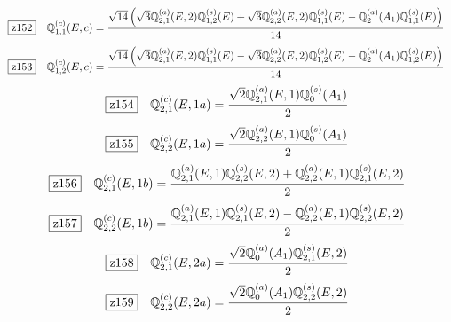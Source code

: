 \documentclass[fleqn,10pt,landscape]{jsarticle}
\begin{document}
\begin{dmath*}
\hspace*{3mm}\fbox{z152}\quad \mathbb{Q}_{1,1}^{(c)}(E,c)=\frac{\sqrt{14} \left(\sqrt{3} \mathbb{Q}_{2,1}^{(a)}(E,2) \mathbb{Q}_{1,2}^{(s)}(E) + \sqrt{3} \mathbb{Q}_{2,2}^{(a)}(E,2) \mathbb{Q}_{1,1}^{(s)}(E) - \mathbb{Q}_{2}^{(a)}(A_{1}) \mathbb{Q}_{1,1}^{(s)}(E)\right)}{14}
\end{dmath*}
\begin{dmath*}
\hspace*{3mm}\fbox{z153}\quad \mathbb{Q}_{1,2}^{(c)}(E,c)=\frac{\sqrt{14} \left(\sqrt{3} \mathbb{Q}_{2,1}^{(a)}(E,2) \mathbb{Q}_{1,1}^{(s)}(E) - \sqrt{3} \mathbb{Q}_{2,2}^{(a)}(E,2) \mathbb{Q}_{1,2}^{(s)}(E) - \mathbb{Q}_{2}^{(a)}(A_{1}) \mathbb{Q}_{1,2}^{(s)}(E)\right)}{14}
\end{dmath*}
\begin{dmath*}
\hspace*{3mm}\fbox{z154}\quad \mathbb{Q}_{2,1}^{(c)}(E,1a)=\frac{\sqrt{2} \mathbb{Q}_{2,1}^{(a)}(E,1) \mathbb{Q}_{0}^{(s)}(A_{1})}{2}
\end{dmath*}
\begin{dmath*}
\hspace*{3mm}\fbox{z155}\quad \mathbb{Q}_{2,2}^{(c)}(E,1a)=\frac{\sqrt{2} \mathbb{Q}_{2,2}^{(a)}(E,1) \mathbb{Q}_{0}^{(s)}(A_{1})}{2}
\end{dmath*}
\begin{dmath*}
\hspace*{3mm}\fbox{z156}\quad \mathbb{Q}_{2,1}^{(c)}(E,1b)=\frac{\mathbb{Q}_{2,1}^{(a)}(E,1) \mathbb{Q}_{2,2}^{(s)}(E,2) + \mathbb{Q}_{2,2}^{(a)}(E,1) \mathbb{Q}_{2,1}^{(s)}(E,2)}{2}
\end{dmath*}
\begin{dmath*}
\hspace*{3mm}\fbox{z157}\quad \mathbb{Q}_{2,2}^{(c)}(E,1b)=\frac{\mathbb{Q}_{2,1}^{(a)}(E,1) \mathbb{Q}_{2,1}^{(s)}(E,2) - \mathbb{Q}_{2,2}^{(a)}(E,1) \mathbb{Q}_{2,2}^{(s)}(E,2)}{2}
\end{dmath*}
\begin{dmath*}
\hspace*{3mm}\fbox{z158}\quad \mathbb{Q}_{2,1}^{(c)}(E,2a)=\frac{\sqrt{2} \mathbb{Q}_{0}^{(a)}(A_{1}) \mathbb{Q}_{2,1}^{(s)}(E,2)}{2}
\end{dmath*}
\begin{dmath*}
\hspace*{3mm}\fbox{z159}\quad \mathbb{Q}_{2,2}^{(c)}(E,2a)=\frac{\sqrt{2} \mathbb{Q}_{0}^{(a)}(A_{1}) \mathbb{Q}_{2,2}^{(s)}(E,2)}{2}
\end{dmath*}
\end{document}
